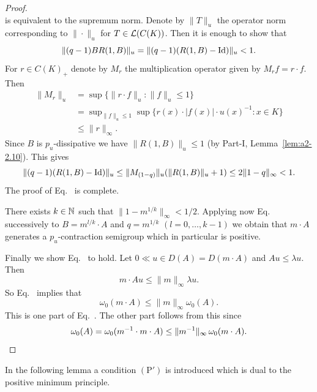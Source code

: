 \begin{proof}
\[\]
is equivalent to the supremum norm.
Denote by $\|T\|_{u}$ the operator norm corresponding to $\|\cdot\|_{u}$ for $T \in \mathcal{L}(C(K))$.
Then it is enough to show that 
%
\[
	 \|(q-1)BR(1,B)\|_{u} = \|(q-1)(R(1,B) - \operatorname{Id})\|_{u} < 1 .
\]
%
For $r \in C(K)_{+}$ denote by $M_{r}$ the multiplication operator given by $M_{r}f = r \cdot f$.
Then 
\begin{align*}
	    \|M_{r}\|_{u} &= \sup\{\|r \cdot f\|_{u} \colon \|f\|_{u} \leq 1\} \\
	              &= \sup\nolimits_{\|f\|_{u} \leq 1}
	              \sup \{ r(x) \cdot |f(x)| \cdot u(x)^{-1}  \colon {x \in K} \}  \\
	              &\leq \|r\|_{\infty}.
\end{align*}
Since $B$ is $p_{u}$-dissipative we have $\|R(1,B)\|_{u} \leq 1$ (by Part-I, Lemma~\ref{lem:a2-2.10}).
This gives 
%
\[
	\|(q-1)(R(1,B) - \Id)\|_{u} \leq \|M_{(1-q)}\|_{u}(\|R(1,B)\|_{u} + 1) \leq 2\|1 - q\|_{\infty} < 1 .
\]
%
The proof of Eq.~ is complete.

There exists $k \in \mathbb{N}$ such that $\|1 - m^{1/k}\|_{\infty} < 1/2$.
Applying now Eq.~ 
successively to $B = m^{l/k} \cdot A$ and $q = m^{1/k}$ $(l = 0, \ldots, k-1)$ we obtain that $m \cdot A$ generates a $p_{u}$-contraction semigroup which in particular is positive.

Finally we show Eq.~ to hold.
Let $0 \ll u \in D(A) = D(m \cdot A)$ and $Au \leq \lambda u$.
Then 
%
\[
	m \cdot Au \leq \|m\|_{\infty}\lambda u .
\]
%
So Eq.~ implies that
%
\[
	  \omega_{0}(m \cdot A) \leq \|m\|_{\infty}\omega_{0}(A) .
\]
%
This is one part of Eq.~. 
The other part follows from this since 
%
\begin{equation*}
	\omega_{0}(A) = \omega_{0}(m^{-1} \cdot m \cdot A) \leq \|m^{-1}\|_{\infty} \, \omega_{0}(m \cdot A).
	\qedhere
\end{equation*}
%
\end{proof}
In the following lemma a condition $(\mathrm{P}')$ is introduced which is dual to the positive minimum principle.

